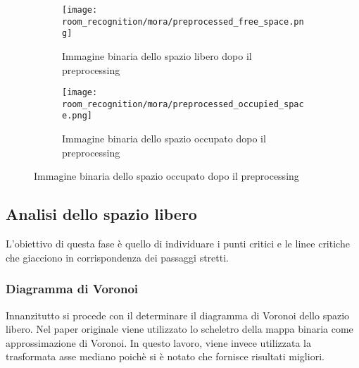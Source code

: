 \begin{figure}[H]
  \begin{subfigure}[t]{0.45\textwidth}
    \centering
    \texttt{[image: room\_recognition/mora/preprocessed\_free\_space.png]}
    \caption{Immagine binaria dello spazio libero dopo il preprocessing}
  \end{subfigure}
  \hfill
  \begin{subfigure}[t]{0.45\textwidth}
    \centering
    \texttt{[image: room\_recognition/mora/preprocessed\_occupied\_space.png]}
    \caption{Immagine binaria dello spazio occupato dopo il preprocessing}
  \end{subfigure}
\end{figure}

\subsection{Analisi dello spazio libero}
L'obiettivo di questa fase è quello di individuare i punti critici e le linee critiche che giacciono in corrispondenza dei passaggi stretti.

\subsubsection{Diagramma di Voronoi}
Innanzitutto si procede con il determinare il diagramma di Voronoi dello spazio libero. Nel paper originale viene utilizzato lo scheletro della mappa binaria come approssimazione di Voronoi. In questo lavoro, viene invece utilizzata la trasformata asse mediano poichè si è notato che fornisce risultati migliori.


